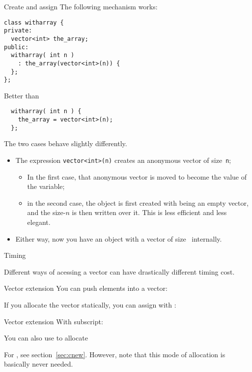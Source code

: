 \begin{block}{Create and assign}
  \label{sl:class-has-vector}
  The following mechanism works:
\begin{lstlisting}
class witharray {
private:
  vector<int> the_array;
public:
  witharray( int n )
    : the_array(vector<int>(n)) {
  };
};
\end{lstlisting}
Better than
\begin{lstlisting}
  witharray( int n ) {
    the_array = vector<int>(n);
  };
\end{lstlisting}
\end{block}

The two cases behave slightly differently.
\begin{itemize}
\item The expression \lstinline{vector<int>(n)} creates an anonymous vector
  of size~\lstinline{n};
  \begin{itemize}
  \item In the first case, that anonymous vector is moved to become
    the value of the  variable;
  \item in the second case, the object is first created with
     being an empty
    vector, and the size-$n$ is then written over it. This is less
    efficient and less elegant.
  \end{itemize}
\item Either way, now you have an object with a vector of size~ internally.
\end{itemize}

 {Timing}

Different ways of acessing a vector can have drastically different
timing cost.

\begin{block}{Vector extension}
  \label{sl:vect-extend-code}
  You can push elements into a vector:

  If you allocate the vector statically, you can assign with :
\end{block}

\begin{block}{Vector extension}
  \label{sl:vect-extend-code2}
  With subscript:

  You can also use  to allocate
\end{block}

For , see section~\ref{sec:cnew}. However, note that
this mode of allocation is basically never needed.

